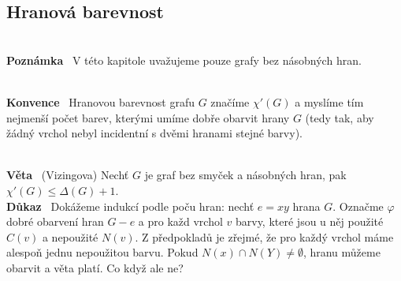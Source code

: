 \documentclass{article}
\renewcommand{\paragraph}[1]{\ \\\smallskip\noindent\textbf{#1}\ }
\begin{document}
\subsection{Hranová barevnost}
\paragraph{Poznámka} V této kapitole uvažujeme pouze grafy bez násobných hran.

\paragraph{Konvence} Hranovou barevnost grafu $G$ značíme $\chi'(G)$ a myslíme 
tím nejmenší počet barev, kterými umíme dobře obarvit hrany $G$ (tedy tak, aby 
žádný vrchol nebyl incidentní s dvěmi hranami stejné barvy).

\paragraph{Věta} (Vizingova) Nechť $G$ je graf bez smyček a násobných hran, pak 
$\chi'(G) \leq \Delta(G)+1$.
\paragraph{Důkaz} Dokážeme indukcí podle poču hran: nechť $e=xy$ hrana $G$.  
Označme $\varphi$ dobré obarvení hran $G-e$ a pro každ vrchol $v$ barvy, které 
jsou u něj použité $C(v)$ a nepoužité $N(v)$. Z předpokladů je zřejmé, že pro 
každý vrchol máme alespoň jednu nepoužitou barvu. Pokud $N(x) \cap N(Y) \neq 
\emptyset$, hranu můžeme obarvit a věta platí. Co když ale ne?
\end{document}
